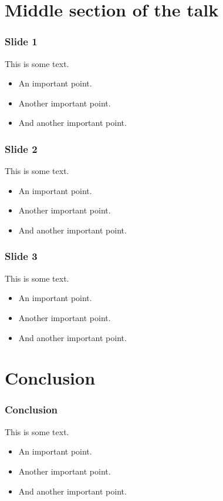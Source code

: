\documentclass[12pt,t,beamer]{beamer}
\begin{document}
\section{Middle section of the talk}

\begin{frame}
  \frametitle{Slide 1}

  This is some text.
  
  \begin{itemize}
  \item<2-> An important point.
  \item<3-> Another important point.
  \item<4-> And another important point.
  \end{itemize}

\end{frame}

\begin{frame}
  \frametitle{Slide 2}

  This is some text.
  
  \begin{itemize}
  \item<2-> An important point.
  \item<3-> Another important point.
  \item<4-> And another important point.
  \end{itemize}

\end{frame}

\begin{frame}
  \frametitle{Slide 3}

  This is some text.
  
  \begin{itemize}
  \item<2-> An important point.
  \item<3-> Another important point.
  \item<4-> And another important point.
  \end{itemize}

\end{frame} 


\section{Conclusion}

\begin{frame}
  \frametitle{Conclusion}

  This is some text.
  
  \begin{itemize}
  \item<2-> An important point.
  \item<3-> Another important point.
  \item<4-> And another important point.
  \end{itemize}

\end{frame}
\end{document}
